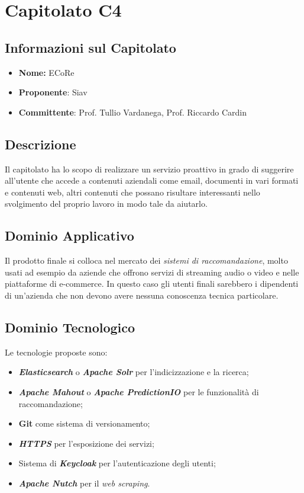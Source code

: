 
\section{Capitolato C4}
\subsection{Informazioni sul Capitolato}
\begin{itemize}
	\item \textbf{Nome:} ECoRe
	\item \textbf{Proponente}: Siav
	\item \textbf{Committente}: Prof. Tullio Vardanega, Prof. Riccardo Cardin
\end{itemize}

\subsection{Descrizione}
Il capitolato ha lo scopo di realizzare un servizio proattivo in grado di suggerire all'utente che accede a contenuti aziendali come email, documenti in vari formati e contenuti web, altri contenuti che possano risultare interessanti nello svolgimento del proprio lavoro in modo tale da aiutarlo. 

\subsection{Dominio Applicativo}
Il prodotto finale si colloca nel mercato dei \textit{sistemi di raccomandazione}, molto usati ad esempio da aziende che offrono servizi di streaming audio o video e nelle piattaforme di e-commerce. In questo caso gli utenti finali sarebbero i dipendenti di un'azienda che non devono avere nessuna conoscenza tecnica particolare. 

\subsection{Dominio Tecnologico}
Le tecnologie proposte sono:
\begin{itemize}
	\item \textit{\textbf{Elasticsearch}} o \textbf{\textit{Apache Solr}} per l'indicizzazione e la ricerca;
	\item \textbf{\textit{Apache Mahout}} o \textbf{\textit{Apache PredictionIO}} per le funzionalità di raccomandazione;
	\item \textbf{Git} come sistema di versionamento;
	\item \textbf{\textit{HTTPS}} per l'esposizione dei servizi;
	\item Sistema di \textbf{\textit {Keycloak}} per l'autenticazione degli utenti;
	\item \textbf{\textit{Apache Nutch}} per il \textit{web scraping}.
\end{itemize}

